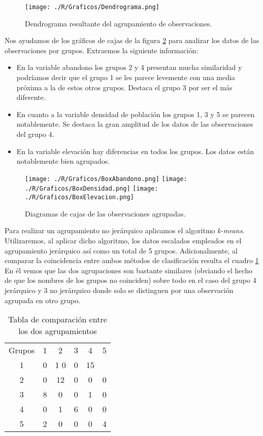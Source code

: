 \documentclass[11pt,a4paper]{article}
\begin{document}
\begin{figure}
\centering
\texttt{[image: ./R/Graficos/Dendrograma.png]}
\caption{Dendrograma resultante del agrupamiento de observaciones.}
\label{fig:dendro}
\end{figure}

Nos ayudamos de los gráficos de cajas de la figura \ref{fig:box} para analizar los datos de las observaciones por grupos. Extraemos la siguiente información:
\begin{itemize}
\item En la variable abandono los grupos 2 y 4 presentan mucha similaridad y podríamos decir que el grupo 1 se les parece levemente con una media próxima a la de estos otros grupos. Destaca el grupo 3 por ser el más diferente.
\item En cuanto a la variable densidad de población los grupos 1, 3 y 5 se parecen notablemente. Se destaca la gran amplitud de los datos de las observaciones del grupo 4.
\item En la variable elevación hay diferencias en todos los grupos. Los datos están notablemente bien agrupados.
\end{itemize}

\begin{figure}
\centering
\texttt{[image: ./R/Graficos/BoxAbandono.png]}
\texttt{[image: ./R/Graficos/BoxDensidad.png]}
\texttt{[image: ./R/Graficos/BoxElevacion.png]}
\caption{Diagramas de cajas de las observaciones agrupadas.}
\label{fig:box}
\end{figure}

Para realizar un agrupamiento no jerárquico aplicamos el algoritmo \textit{k-means}. Utilizaremos, al aplicar dicho algoritmo, los datos escalados empleados en el agrupamiento jerárquico así como un total de 5 grupos. Adicionalmente, al comparar la coincidencia entre ambos métodos de clasificación resulta el cuadro \ref{tab:comp} En él vemos que las dos agrupaciones son bastante similares (obviando el hecho de que los nombres de los grupos no coinciden) sobre todo en el caso del grupo 4 jerárquico y 3 no jerárquico donde solo se distinguen por una observación agrupada en otro grupo.

\begin{table}[ht]
\centering
\begin{tabular}{cccccc}
\toprule[0.4mm]
Grupos & 1 & 2 & 3 & 4 & 5\\
1 & 0 & 1 0 & 0 & 15\\
2 & 0 & 12 & 0 & 0 & 0\\
3 & 8 & 0 & 0 & 1 & 0\\
4 & 0 & 1 & 6 & 0 & 0\\
5 & 2 & 0 & 0 & 0 & 4\\
\bottomrule[0.4mm]
\end{tabular}
\caption{Tabla de comparación entre los dos agrupamientos}
\label{tab:comp}
\end{table}
\end{document}
